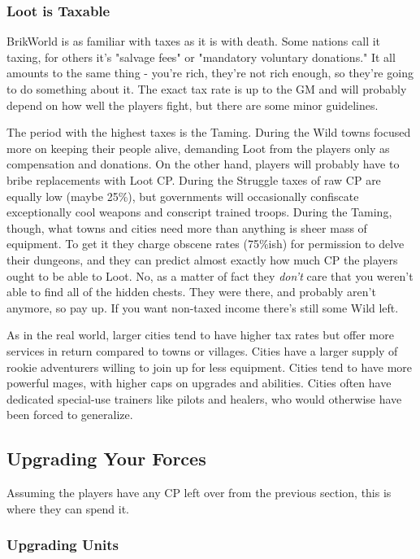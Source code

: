 \documentclass[12pt,a4paper,twocolumn]{article}
\begin{document}
\subsubsection{Loot is Taxable}

BrikWorld is as familiar with taxes as it is with death.  Some nations call it taxing, for others it's "salvage fees" or "mandatory voluntary donations."  It all amounts to the same thing - you're rich, they're not rich enough, so they're going to do something about it.  The exact tax rate is up to the GM and will probably depend on how well the players fight, but there are some minor guidelines. 

The period with the highest taxes is the Taming.  During the Wild towns focused more on keeping their people alive, demanding Loot from the players only as compensation and donations.  On the other hand, players will probably have to bribe replacements with Loot CP.  During the Struggle taxes of raw CP are equally low (maybe 25\%), but governments will occasionally confiscate exceptionally cool weapons and conscript trained troops.  During the Taming, though, what towns and cities need more than anything is sheer mass of equipment.  To get it they charge obscene rates (75\%ish) for permission to delve their dungeons, and they can predict almost exactly how much CP the players ought to be able to Loot.  No, as a matter of fact they {\it don't} care that you weren't able to find all of the hidden chests.  They were there, and probably aren't anymore, so pay up.  If you want non-taxed income there's still some Wild left.

As in the real world, larger cities tend to have higher tax rates but offer more services in return compared to towns or villages.  Cities have a larger supply of rookie adventurers willing to join up for less equipment.  Cities tend to have more powerful mages, with higher caps on upgrades and abilities.  Cities often have dedicated special-use trainers like pilots and healers, who would otherwise have been forced to generalize.

\subsection{Upgrading Your Forces}

Assuming the players have any CP left over from the previous section, this is where they can spend it.

\subsubsection{Upgrading Units}
\end{document}
